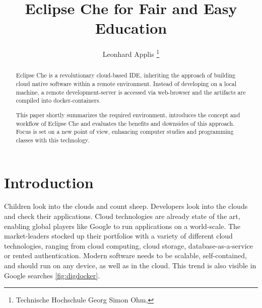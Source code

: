 \documentclass[utf8]{lni}
\begin{document}
\title[Eclipse Che for Education]{Eclipse Che for Fair and Easy Education}
\author[Leonhard Applis]
{Leonhard Applis \footnote{Technische Hochschule Georg Simon Ohm, }}
\maketitle

\begin{abstract}
Eclipse Che is a revolutionary cloud-based IDE, inheriting the approach of building cloud native software within a 
remote environment. 
Instead of developing on a local machine, a remote development-server is accessed via web-browser 
and the artifacts are compiled into docker-containers. 

This paper shortly summarizes the required environment, introduces the concept and workflow of Eclipse Che and evaluates 
the benefits and downsides of this approach. 
Focus is set on a new point of view, enhancing computer studies and 
programming classes with this technology. 
\end{abstract}


\section{Introduction}
\label{sec:Introduction}
Children look into the clouds and count sheep. 
Developers look into the clouds and check their applications.  
Cloud technologies are already state of the art, enabling global players like Google to run applications on a world-scale.
The market-leaders stocked up their portfolios with  a  variety  of  different  cloud  technologies,  ranging from cloud computing, cloud storage, database-as-a-service or rented authentication. 
Modern software needs to be scalable, self-contained, and should run on any device, as well as in the cloud.  
This trend is also visible in Google searches \ref{fig:digdocker}. 
\end{document}
